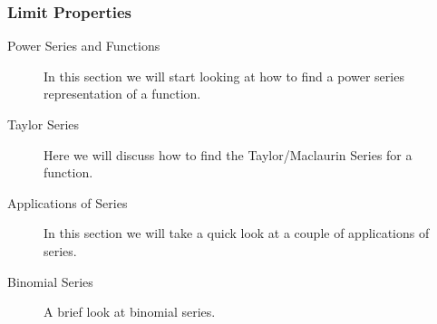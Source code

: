 \documentclass{beamer}
\begin{document}
\begin{frame}[fragile]
	\frametitle{Limit Properties}
	\Large
\begin{description}	
\item[Power Series and Functions]  In this section we will start looking at how to find a power series representation of a function.
 
\item[Taylor Series]  Here we will discuss how to find the Taylor/Maclaurin Series for a function.
 
\item[Applications of Series]  In this section we will take a quick look at a couple of applications of series.
 
\item[Binomial Series]  A brief look at binomial series.
\end{description}
\end{frame}
\end{document}
